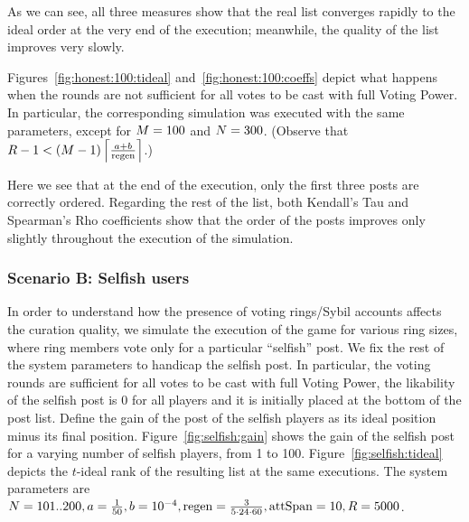       As we can see, all three measures show that the real list converges
      rapidly to the ideal order at the very end of the execution; meanwhile,
      the quality of the list improves very slowly.

      Figures~\ref{fig:honest:100:tideal} and~\ref{fig:honest:100:coeffs} depict
      what happens when the rounds are not sufficient for all votes to be cast
      with full Voting Power. In particular, the corresponding simulation was
      executed with the same parameters, except for $\postlen = 100$ and
      $\playerlen = 300$. (Observe that $\rounds - 1 < \left(\postlen -
      1\right)\ceil*{\frac{a + b}{\regen}}$.)

      Here we see that at the end of the execution, only the first three posts
      are correctly ordered. Regarding the rest of the list, both Kendall's Tau
      and Spearman's Rho coefficients show that the order of the posts improves
      only slightly throughout the execution of the simulation.

    \subsubsection{Scenario B: Selfish users}
      In order to understand how the presence of voting rings/Sybil accounts
      affects the curation quality, we simulate the execution of the game for
      various ring sizes, where ring members vote only for a particular
      ``selfish'' post. We fix the rest of the system parameters to handicap the
      selfish post. In particular, the voting rounds are sufficient for all
      votes to be cast with full Voting Power, the likability of the selfish
      post is 0 for all players and it is initially placed at the bottom of the
      post list. Define the gain of the post of the selfish players as its ideal
      position minus its final position. Figure~\ref{fig:selfish:gain} shows the
      gain of the selfish post for a varying number of selfish players, from 1
      to 100.  Figure~\ref{fig:selfish:tideal} depicts the $t$-ideal rank of the
      resulting list at the same executions. The system parameters are
      $\playerlen = 101 .. 200, a = \frac{1}{50}, b = 10^{-4}, \regen =
      \frac{3}{5 \cdot 24 \cdot 60}, \attspan = 10, \rounds = 5000$.
